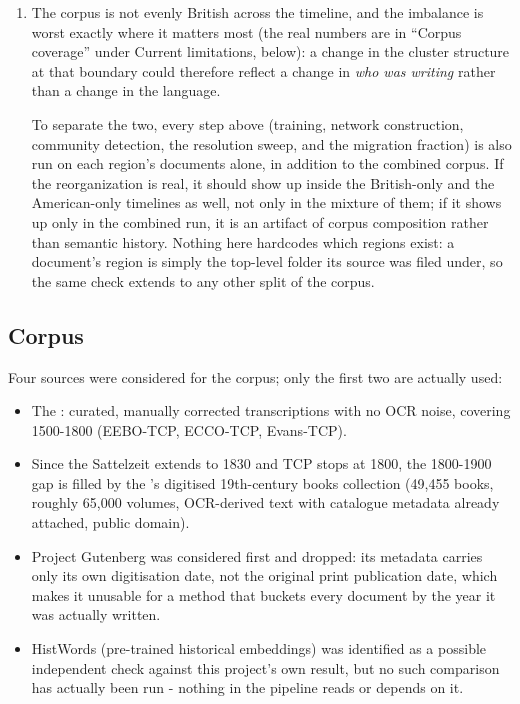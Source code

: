 \documentclass[11pt]{article}
\begin{document}
\begin{enumerate}
  \item {} The corpus is
    not evenly British across the timeline, and the imbalance is worst
    exactly where it matters most (the real numbers are in ``Corpus
    coverage'' under Current limitations, below): a change in the
    cluster structure at that boundary could therefore reflect a
    change in \emph{who was writing} rather than a change in the
    language.

    To separate the two, every step above (training, network
    construction, community detection, the resolution sweep, and the
    migration fraction) is also run on each region's documents alone, in
    addition to the combined corpus. If the reorganization is real, it
    should show up inside the British-only and the American-only
    timelines as well, not only in the mixture of them; if it shows up
    only in the combined run, it is an artifact of corpus composition
    rather than semantic history. Nothing here hardcodes which regions
    exist: a document's region is simply the top-level folder its
    source was filed under, so the same check extends to any other
    split of the corpus.


\end{enumerate}

\subsection{Corpus}

Four sources were considered for the corpus; only the first two are
actually used:

\begin{itemize}
  \item {} The : curated, manually corrected transcriptions with no OCR
    noise, covering 1500-1800 (EEBO-TCP, ECCO-TCP, Evans-TCP).
  \item {} Since the Sattelzeit extends to 1830 and TCP
    stops at 1800, the 1800-1900 gap is filled by the 's digitised 19th-century books collection (49{,}455 books,
    roughly 65{,}000 volumes, OCR-derived text with catalogue metadata
    already attached, public domain).
  \item {} Project Gutenberg was considered
    first and dropped: its metadata carries only its own digitisation
    date, not the original print publication date, which makes it
    unusable for a method that buckets every document by the year it
    was actually written.
  \item {} HistWords (pre-trained historical
    embeddings) was identified as a possible independent check against
    this project's own result, but no such comparison has actually
    been run - nothing in the pipeline reads or depends on it.
\end{itemize}
\end{document}
